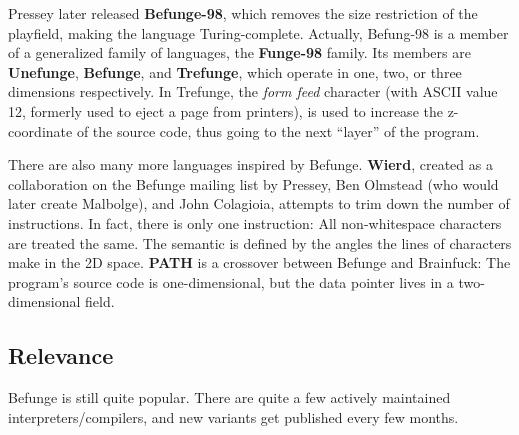 Pressey later released \textbf{Befunge-98}, which removes the size restriction of the playfield, making the language Turing-complete. Actually, Befung-98 is a member of a generalized family of languages, the \textbf{Funge-98} family. Its members are \textbf{Unefunge}, \textbf{Befunge}, and \textbf{Trefunge}, which operate in one, two, or three dimensions respectively. In Trefunge, the \emph{form feed} character (with ASCII value 12, formerly used to eject a page from printers), is used to increase the z-coordinate of the source code, thus going to the next “layer” of the program.

There are also many more languages inspired by Befunge. \textbf{Wierd}, created as a collaboration on the Befunge mailing list by Pressey, Ben Olmstead (who would later create Malbolge), and John Colagioia, attempts to trim down the number of instructions. In fact, there is only one instruction: All non-whitespace characters are treated the same. The semantic is defined by the angles the lines of characters make in the 2D space. \textbf{PATH} is a crossover between Befunge and Brainfuck: The program's source code is one-dimensional, but the data pointer lives in a two-dimensional field. 

\subsection{Relevance}

Befunge is still quite popular. There are quite a few actively maintained interpreters/compilers, and new variants get published every few months.
